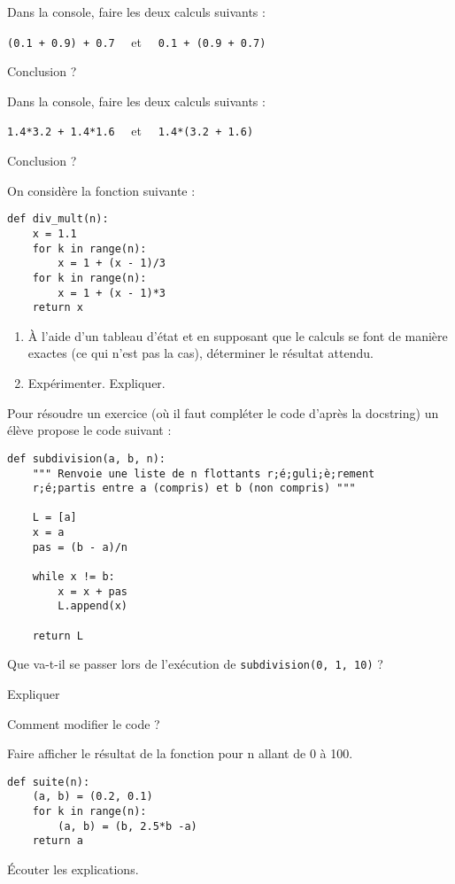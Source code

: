 Dans la console, faire les deux calculs suivants : 

\verb!(0.1 + 0.9) + 0.7! \ \ et \ \ \verb!0.1 + (0.9 + 0.7)!

Conclusion ?


Dans la console, faire les deux calculs suivants : 

\verb!1.4*3.2 + 1.4*1.6! \ \ et \ \ \verb!1.4*(3.2 + 1.6)!

Conclusion ?


\exercice{}

On considère la fonction suivante : 

\begin{lstlisting}
def div_mult(n):
    x = 1.1
    for k in range(n):
        x = 1 + (x - 1)/3
    for k in range(n):
        x = 1 + (x - 1)*3
    return x

\end{lstlisting}

\begin{enumerate}[1.]
  \item \`A l'aide d'un tableau d'état et en supposant que le calculs se font de manière exactes (ce qui n'est pas la cas), déterminer le résultat attendu.
  \item Expérimenter. Expliquer.

\end{enumerate}


Pour résoudre un exercice (où il faut compléter le code d'après la docstring) un élève propose le code suivant : 

\begin{lstlisting}[escapeinside =;;]
def subdivision(a, b, n):
    """ Renvoie une liste de n flottants r;é;guli;è;rement
    r;é;partis entre a (compris) et b (non compris) """
    
    L = [a]
    x = a
    pas = (b - a)/n
    
    while x != b:
        x = x + pas
        L.append(x)

    return L

\end{lstlisting}

Que va-t-il se passer lors de l'exécution de \verb+subdivision(0, 1, 10)+ ?

Expliquer 

Comment modifier le code ?



Faire afficher le résultat de la fonction pour n allant de 0 à 100.

\begin{lstlisting}
def suite(n):
    (a, b) = (0.2, 0.1)
    for k in range(n):
        (a, b) = (b, 2.5*b -a)
    return a

\end{lstlisting}

 \'Ecouter les explications.


